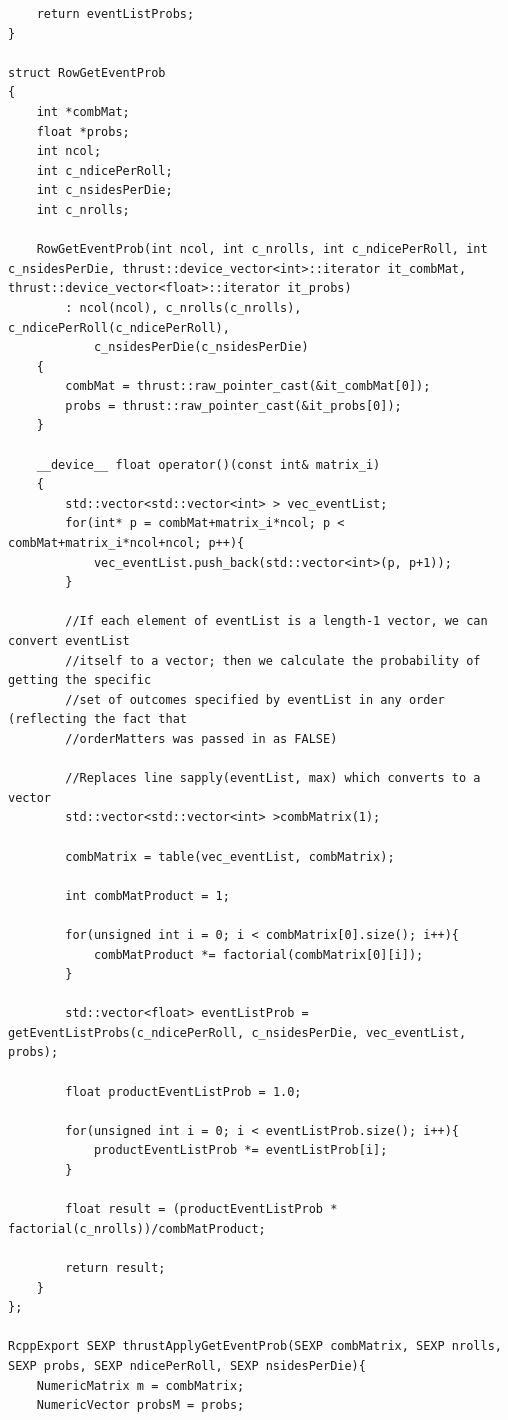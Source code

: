\documentclass[12pt]{article}
\begin{document}
\begin{lstlisting}
    return eventListProbs;
}

struct RowGetEventProb
{
    int *combMat;
    float *probs;
    int ncol;
    int c_ndicePerRoll;
    int c_nsidesPerDie;
    int c_nrolls;

    RowGetEventProb(int ncol, int c_nrolls, int c_ndicePerRoll, int c_nsidesPerDie, thrust::device_vector<int>::iterator it_combMat, thrust::device_vector<float>::iterator it_probs)
        : ncol(ncol), c_nrolls(c_nrolls), c_ndicePerRoll(c_ndicePerRoll), 
            c_nsidesPerDie(c_nsidesPerDie)
    {
        combMat = thrust::raw_pointer_cast(&it_combMat[0]);
        probs = thrust::raw_pointer_cast(&it_probs[0]);
    }

    __device__ float operator()(const int& matrix_i)
    {
        std::vector<std::vector<int> > vec_eventList;
        for(int* p = combMat+matrix_i*ncol; p < combMat+matrix_i*ncol+ncol; p++){
            vec_eventList.push_back(std::vector<int>(p, p+1));
        }
            
        //If each element of eventList is a length-1 vector, we can convert eventList
        //itself to a vector; then we calculate the probability of getting the specific
        //set of outcomes specified by eventList in any order (reflecting the fact that
        //orderMatters was passed in as FALSE)

        //Replaces line sapply(eventList, max) which converts to a vector
        std::vector<std::vector<int> >combMatrix(1);

        combMatrix = table(vec_eventList, combMatrix);

        int combMatProduct = 1;

        for(unsigned int i = 0; i < combMatrix[0].size(); i++){
            combMatProduct *= factorial(combMatrix[0][i]);
        }

        std::vector<float> eventListProb = getEventListProbs(c_ndicePerRoll, c_nsidesPerDie, vec_eventList, probs);

        float productEventListProb = 1.0;

        for(unsigned int i = 0; i < eventListProb.size(); i++){
            productEventListProb *= eventListProb[i];
        }
        
        float result = (productEventListProb * factorial(c_nrolls))/combMatProduct;

        return result;
    }
};

RcppExport SEXP thrustApplyGetEventProb(SEXP combMatrix, SEXP nrolls, SEXP probs, SEXP ndicePerRoll, SEXP nsidesPerDie){
    NumericMatrix m = combMatrix;
    NumericVector probsM = probs;


\end{lstlisting}
\end{document}
